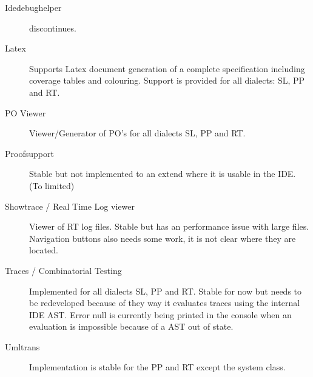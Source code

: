\begin{description}


\item[Idedebughelper] discontinues.
\item[Latex] Supports Latex document generation of a complete specification including coverage tables and colouring. Support is provided for all dialects: SL, PP and RT.

\item[PO Viewer] Viewer/Generator of PO's for all dialects SL, PP and RT.
\item[Proofsupport] Stable but not implemented to an extend where it is usable in the IDE. (To limited)
\item[Showtrace / Real Time Log viewer] Viewer of RT log files. Stable but has an performance issue with large files. Navigation buttons also needs some work, it is not clear where they are located.
\item[Traces / Combinatorial Testing] Implemented for all dialects SL, PP and RT. Stable for now but needs to be redeveloped because of they way it evaluates traces using the internal IDE AST. Error null is currently being printed in the console when an evaluation is impossible because of a AST out of state.
\item[Umltrans] Implementation is stable for the PP and RT except the system class.
\end{description}

